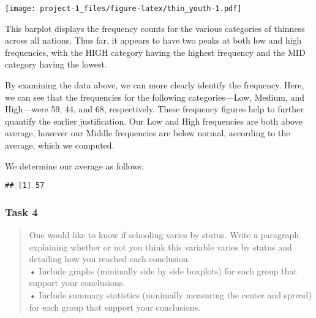 \documentclass[
]{article}
\newenvironment{Shaded}{\begin{snugshade}}{\end{snugshade}}
\newcommand{\AttributeTok}[1]{\textcolor[rgb]{0.77,0.63,0.00}{#1}}
\newcommand{\DecValTok}[1]{\textcolor[rgb]{0.00,0.00,0.81}{#1}}
\newcommand{\FunctionTok}[1]{\textcolor[rgb]{0.00,0.00,0.00}{#1}}
\newcommand{\NormalTok}[1]{#1}
\newcommand{\SpecialCharTok}[1]{\textcolor[rgb]{0.00,0.00,0.00}{#1}}
\newcommand{\StringTok}[1]{\textcolor[rgb]{0.31,0.60,0.02}{#1}}
\begin{document}
\texttt{[image: project-1\_files/figure-latex/thin\_youth-1.pdf]}

This barplot displays the frequency counts for the various categories of
thinness across all nations. Thus far, it appears to have two peaks at
both low and high frequencies, with the HIGH category having the highest
frequency and the MID category having the lowest.

By examining the data above, we can more clearly identify the frequency.
Here, we can see that the frequencies for the following
categories---Low, Medium, and High---were 59, 44, and 68, respectively.
These frequency figures help to further quantify the earlier
justification. Our Low and High frequencies are both above average,
however our Middle frequencies are below normal, according to the
average, which we computed.

We determine our average as follows:

\begin{Shaded}
\end{Shaded}

\begin{verbatim}
## [1] 57
\end{verbatim}

\hypertarget{task-4}{%
\subsubsection{Task 4}\label{task-4}}

\begin{quote}
One would like to know if schooling varies by status. Write a paragraph
explaining whether or not you think this variable varies by status and
detailing how you reached each conclusion.\\
• Include graphs (minimally side by side boxplots) for each group that
support your conclusions.\\
• Include summary statistics (minimally measuring the center and spread)
for each group that support your conclusions.
\end{quote}

\begin{Shaded}
\end{Shaded}
\end{document}
